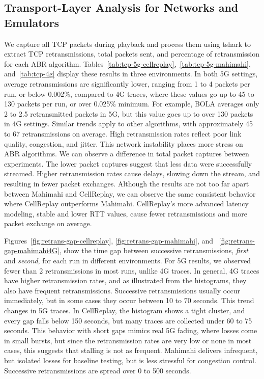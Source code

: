 \subsection{Transport-Layer Analysis for Networks and Emulators}
\label{sec:tcp-analysis}

We capture all TCP packets during playback and process them using tshark to extract TCP retransmissions, total packets sent, and percentage of retransmission for each ABR algorithm. Tables~\ref{tab:tcp-5g-cellreplay},~\ref{tab:tcp-5g-mahimahi}, and~\ref{tab:tcp-4g} display these results in three environments. In both 5G settings, average retransmissions are significantly lower, ranging from 1 to 4 packets per run, or below 0.002\%, compared to 4G traces, where these values go up to 45 to 130 packets per run, or over 0.025\% minimum. For example, BOLA averages only 2 to 2.5 retransmitted packets in 5G, but this value goes up to over 130 packets in 4G settings. Similar trends apply to other algorithms, with approximately 45 to 67 retransmissions on average. High retransmission rates reflect poor link quality, congestion, and jitter. This network instability places more stress on ABR algorithms. We can observe a difference in total packet captures between experiments. The lower packet captures suggest that less data were successfully streamed. Higher retransmission rates cause delays, slowing down the stream, and resulting in fewer packet exchanges. Although the results are not too far apart between Mahimahi and CellReplay, we can observe the same consistent behavior where CellReplay outperforms Mahimahi. CellReplay's more advanced latency modeling, stable and lower RTT values, cause fewer retransmissions and more packet exchange on average.

Figures~\ref{fig:retrans-gap-cellreplay}, \ref{fig:retrans-gap-mahimahi}, and ~\ref{fig:retrans-gap-mahimahi4G}, show the time gap between successive retransmissions, \emph{first} and \emph{second}, for each run in different environments. For 5G results, we observed fewer than 2 retransmissions in most runs, unlike 4G traces. In general, 4G traces have higher retransmission rates, and as illustrated from the histograms, they also have frequent retransmissions. Successive retransmissions usually occur immediately, but in some cases they occur between 10 to 70 seconds. This trend changes in 5G traces. In CellReplay, the histogram shows a tight cluster, and every gap falls below 150 seconds, but many traces are collected under 60 to 75 seconds. This behavior with short gaps mimics real 5G fading, where losses come in small bursts, but since the retransmission rates are very low or none in most cases, this suggests that stalling is not as frequent. Mahimahi delivers infrequent, but isolated losses for baseline testing, but is less stressful for congestion control. Successive retransmissions are spread over 0 to 500 seconds.


